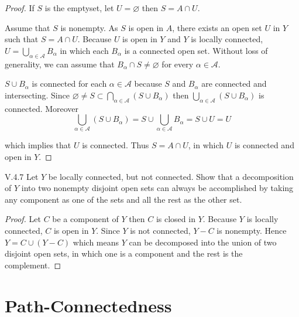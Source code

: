 \begin{proof}
	If \( S \) is the emptyset, let \( U = \varnothing \) then \( S = A \cap U \).

	Assume that \( S \) is nonempty. As \( S \) is open in \( A \), there exists an open set \( U \) in \( Y \) such that \( S = A \cap U \). Because \( U \) is open in \( Y \) and \( Y \) is locally connected, \( U = \bigcup_{\alpha\in\mathscr{A}} B_{\alpha} \) in which each \( B_{\alpha} \) is a connected open set. Without loss of generality, we can assume that \( B_{\alpha} \cap S \ne \varnothing \) for every \( \alpha \in \mathscr{A} \).

	\( S \cup B_{\alpha} \) is connected for each \( \alpha \in \mathscr{A} \) because \( S \) and \( B_{\alpha} \) are connected and intersecting. Since \( \varnothing \ne S \subset \bigcap_{\alpha\in\mathscr{A}} (S \cup B_{\alpha}) \) then \( \bigcup_{\alpha\in\mathscr{A}} (S \cup B_{\alpha}) \) is connected. Moreover
	\[
		\bigcup_{\alpha\in\mathscr{A}} (S \cup B_{\alpha}) = S \cup \bigcup_{\alpha\in\mathscr{A}} B_{\alpha} = S \cup U = U
	\]

	which implies that \( U \) is connected. Thus \( S = A \cap U \), in which \( U \) is connected and open in \( Y \).
\end{proof}

\begin{problem}{V.4.7}
Let \( Y \) be locally connected, but not connected. Show that a decomposition of \( Y \) into two nonempty disjoint open sets can always be accomplished by taking any component as one of the sets and all the rest as the other set.
\end{problem}

\begin{proof}
	Let \( C \) be a component of \( Y \) then \( C \) is closed in \( Y \). Because \( Y \) is locally connected, \( C \) is open in \( Y \). Since \( Y \) is not connected, \( Y - C \) is nonempty. Hence \( Y = C \cup (Y - C) \) which means \( Y \) can be decomposed into the union of two disjoint open sets, in which one is a component and the rest is the complement.
\end{proof}

\section{Path-Connectedness}

